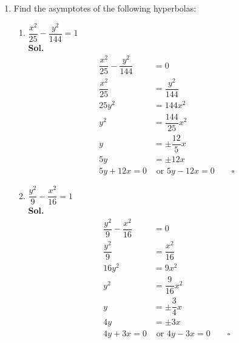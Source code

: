 \documentclass{report}
\newcommand{\sol}{\vspace{1em}\\\textbf{Sol.}}
\newcommand{\eos}{ \qquad \square}
\begin{document}
\begin{enumerate}[leftmargin=*]
    \item Find the asymptotes of the following hyperbolas:
          \begin{enumerate}
              \item $\dfrac{x^2}{25}-\dfrac{y^2}{144}=1$
                    \sol{}
                    \begin{align*}
                        \dfrac{x^2}{25}-\dfrac{y^2}{144} & =0                            \\
                        \dfrac{x^2}{25}                  & =\dfrac{y^2}{144}             \\
                        25y^2                            & =144x^2                       \\
                        y^2                              & =\dfrac{144}{25}x^2           \\
                        y                                & =\pm\dfrac{12}{5}x            \\
                        5y                               & =\pm 12x                      \\
                        5y + 12x = 0                     & \text{ or } 5y - 12x = 0 \eos
                    \end{align*}

              \item $\dfrac{y^2}{9}-\dfrac{x^2}{16}=1$
                    \sol{}
                    \begin{align*}
                        \dfrac{y^2}{9}-\dfrac{x^2}{16} & =0                           \\
                        \dfrac{y^2}{9}                 & =\dfrac{x^2}{16}             \\
                        16y^2                          & =9x^2                        \\
                        y^2                            & =\dfrac{9}{16}x^2            \\
                        y                              & =\pm\dfrac{3}{4}x            \\
                        4y                             & =\pm 3x                      \\
                        4y + 3x = 0                    & \text{ or } 4y - 3x = 0 \eos
                    \end{align*}


\end{enumerate}
\end{enumerate}
\end{document}
